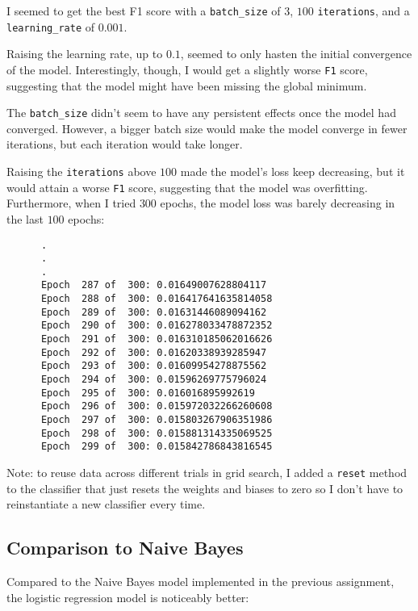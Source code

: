 \begin{enumarabic}
  \item I seemed to get the best F1 score with a \verb|batch_size| of $3$,
    $100$ \verb|iterations|, and a \verb|learning_rate| of $0.001$.
  \item Raising the learning rate, up to $0.1$, seemed to only hasten the initial
    convergence of the model. Interestingly, though, I would get a slightly worse
    \verb|F1| score, suggesting that the model might have been missing
    the global minimum.
  \item The \verb|batch_size| didn't seem to have any persistent effects
    once the model had converged. However, a bigger batch size would
    make the model converge in fewer iterations, but each iteration would take longer.
  \item Raising the \verb|iterations| above $100$ made the model's loss keep decreasing,
    but it would attain a worse \verb|F1| score, suggesting that the model was overfitting.
    Furthermore, when I tried $300$ epochs, the model loss was barely decreasing
    in the last $100$ epochs:
    \begin{verbatim}
      .
      .
      .
      Epoch  287 of  300: 0.01649007628804117
      Epoch  288 of  300: 0.016417641635814058
      Epoch  289 of  300: 0.01631446089094162
      Epoch  290 of  300: 0.016278033478872352
      Epoch  291 of  300: 0.016310185062016626
      Epoch  292 of  300: 0.01620338939285947
      Epoch  293 of  300: 0.01609954278875562
      Epoch  294 of  300: 0.01596269775796024
      Epoch  295 of  300: 0.016016895992619
      Epoch  296 of  300: 0.015972032266260608
      Epoch  297 of  300: 0.015803267906351986
      Epoch  298 of  300: 0.015881314335069525
      Epoch  299 of  300: 0.015842786843816545
    \end{verbatim}
\end{enumarabic}

Note: to reuse data across different trials in grid search,
I added a \verb|reset| method to the classifier that just
resets the weights and biases to zero so I don't have to
reinstantiate a new classifier every time.

\newpage
\subsection{Comparison to Naive Bayes}

Compared to the Naive Bayes model implemented in the previous assignment,
the logistic regression model is noticeably better:

